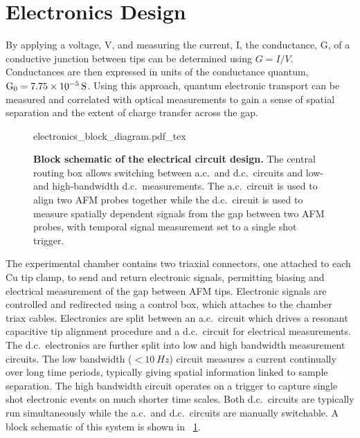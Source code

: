 \documentclass{article}
\begin{document}
\section{Electronics Design}
\label{sec:electronic_design}

By applying a voltage, \gls{V}, and measuring the current, \gls{I}, the conductance, \gls{G}, of a conductive junction between tips can be determined using $G=I/V$. Conductances are then expressed in units of the conductance quantum, $\mathrm{G_{0}} = \SI{7.75e-5}{S}$. Using this approach, quantum electronic transport can be measured and correlated with optical measurements to gain a sense of spatial separation and the extent of charge transfer across the gap. %

\begin{figure}[bt]
\centering
\fontsize{10pt}{1em}\selectfont
{electronics_block_diagram.pdf_tex}
\caption[Block schematic of the electrical circuit design.]{\textbf{Block schematic of the electrical circuit design.} The central routing box allows switching between a.c.\ and d.c.\ circuits and low- and high-bandwidth d.c.\ measurements. The a.c.\ circuit is used to align two AFM probes together while the d.c.\ circuit is used to measure spatially dependent signals from the gap between two AFM probes, with temporal signal measurement set to a single shot trigger.}
\label{fig:block_circuit_design}
\end{figure}

The experimental chamber contains two triaxial connectors, one attached to each Cu tip clamp, to send and return electronic signals, permitting biasing and electrical measurement of the gap between AFM tips. Electronic signals are controlled and redirected using a control box, which attaches to the chamber triax cables. Electronics are split between an a.c.\ circuit which drives a resonant capacitive tip alignment procedure and a d.c.\ circuit for electrical measurements. The d.c.\ electronics are further split into low and high bandwidth measurement circuits. The low bandwidth ($<\SI{10}{Hz}$) circuit measures a current continually over long time periods, typically giving spatial information linked to sample separation. The high bandwidth circuit operates on a trigger to capture single shot electronic events on much shorter time scales. Both d.c.\ circuits are typically run simultaneously while the a.c.\ and d.c.\ circuits are manually switchable. A block schematic of this system is shown in \figurename~\ref{fig:block_circuit_design}.
\end{document}
